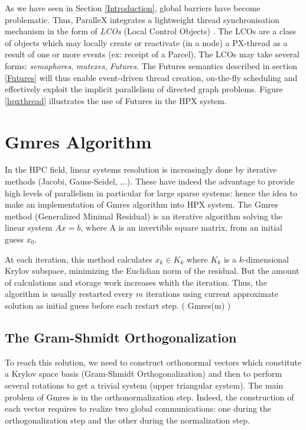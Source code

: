 \documentclass[smallextended]{svjour3}
\begin{document}
As we have seen in Section \ref{Introduction}, global barriers have become problematic. Thus, ParalleX integrates a lightweight thread synchronisation
mechanism in the form of \emph{LCOs} (Local Control Objects) \cite{ParalleX}. The LCOs are a class of objects which may locally create or reactivate (in a node) a PX-thread as a result of one or more events (ex: receipt of a Parcel). The LCOs may take several forms: \emph{semaphores}, \emph{mutexes}, \emph{Futures}. The Futures semantics described in section \ref{Futures} will thus enable event-driven thread creation, on-the-fly scheduling and effectively exploit the implicit parallelism of directed graph problems. Figure \ref{hpxthread} illustrates the use of Futures in the HPX system.

\section{Gmres Algorithm}\label{Gmres}
In the HPC field, linear systems resolution is increasingly done by iterative methods \cite{Methodes} (Jacobi, Gauss-Seidel, ...). These have indeed the advantage to provide high levels of parallelism in particular for large sparse systems: hence the idea to make an implementation of Gmres algorithm into HPX system. The Gmres method (Generalized Minimal Residual) \cite{GMRES} is an iterative algorithm solving the linear system $Ax=b$, where A is an invertible square matrix, from an initial guess $x_{0}$.\smallskip

At each iteration, this method calculates $x_{k} \in K_{k}$ where $K_{k}$ is a $k$-dimensional Krylov subspace, minimizing the Euclidian norm of the residual. But the amount of calculations and storage work increases whith the iteration. Thus, the algorithm is usually restarted every $m$ iterations using current approximate solution as initial guess before each restart step. ( Gmres(m) ) \cite{GMRES}

\subsection{The Gram-Shmidt Orthogonalization}
To reach this solution, we need to construct orthonormal vectors which constitute a Krylov space basis (Gram-Shmidt Orthogonalization) and then to perform several rotations to get a trivial system (upper triangular system). The main problem of Gmres is in the orthonormalization step. Indeed, the construction of each vector requires to realize two global communications: one during the orthogonalization step and the other during the normalization step.
\end{document}
